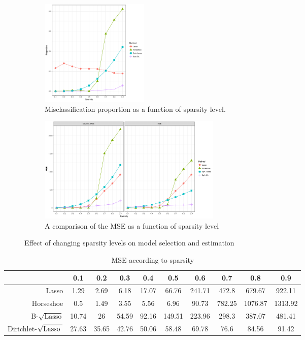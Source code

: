 \documentclass[10pt]{article}
\def\sql{$\sqrt{\text{Lasso}}$}
\def\sqdl{Dirichlet-$\sqrt{\text{\rm{Lasso} }}$}
\begin{document}
\begin{figure}[ht!]
\centering
\begin{subfigure}[t]{0.8\linewidth}
\centering
\includegraphics[height = 2in, width =\linewidth]{Sparsity_MSP_n=p}
\caption{Misclassification proportion as a function of sparsity level.}
\label{fig:msp}

\end{subfigure}
\begin{subfigure}[t]{0.8\linewidth}
  \centering
  \includegraphics[height = 2in, width=\linewidth]{Sparsity_MSE_high_n=p}\caption{A comparison of the MSE as a function of sparsity level}
\label{fig:test}
\end{subfigure}
\caption{Effect of changing sparsity levels on model selection and estimation}
\label{fig:sparsity}
\end{figure}


\begin{table}[h!]
\caption{MSE according to sparsity}\label{MSE}
\begin{center}
\footnotesize{
\begin{tabular}{c|c|c|c|c|c|c|c|c|c|}
\cline{2-10}
    & 0.1  &  0.2  &  0.3  &  0.4  &  0.5 &   0.6  &  0.7  &  0.8 &   0.9 	\\
\hline
\multicolumn{1}{|r|}{Lasso} & 1.29 &  2.69 &  6.18 &  17.07 & 66.76 &  241.71 & 472.8 &  679.67 &  922.11	\\
\hline
\multicolumn{1}{|r|}{Horseshoe} &   0.5 &   1.49 &  3.55 &  5.56 &  6.96 &   90.73 &  782.25 & 1076.87 & 1313.92 \\
\hline
\multicolumn{1}{|r|}{B-\sql} & 10.74 & 26 &    54.59 & 92.16 & 149.51 & 223.96 & 298.3 &  387.07 &  481.41 \\
\hline
\multicolumn{1}{|r|}{\sqdl} & 27.63 & 35.65 & 42.76 & 50.06 & 58.48 &  69.78 &  76.6 &   84.56 &   91.42 \\
\hline
\end{tabular}}
\end{center}
\end{table}
\end{document}
